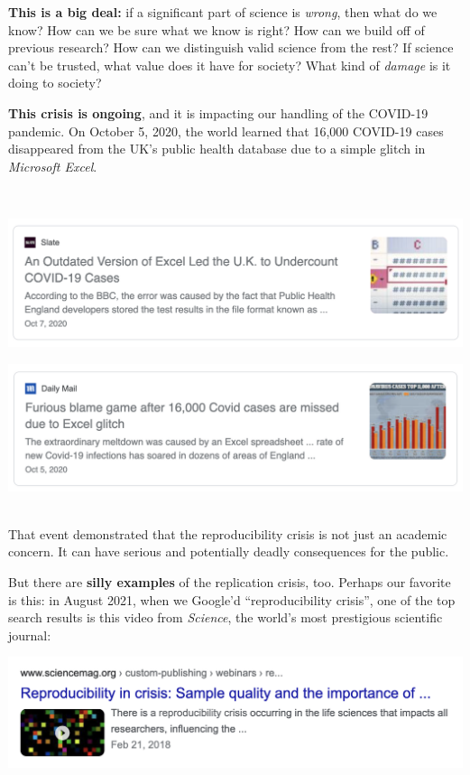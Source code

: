 \documentclass[
]{book}
\begin{document}
\textbf{This is a big deal:} if a significant part of science is \emph{wrong}, then what do we know? How can we be sure what we know is right? How can we build off of previous research? How can we distinguish valid science from the rest? If science can't be trusted, what value does it have for society? What kind of \emph{damage} is it doing to society?

\textbf{This crisis is ongoing}, and it is impacting our handling of the COVID-19 pandemic. On October 5, 2020, the world learned that 16,000 COVID-19 cases disappeared from the UK's public health database due to a simple glitch in \emph{Microsoft Excel}.

~

\includegraphics{img/reproducibility-covid-1.png}

\includegraphics{img/reproducibility-covid-2.png}
~

That event demonstrated that the reproducibility crisis is not just an academic concern. It can have serious and potentially deadly consequences for the public.

But there are \textbf{silly examples} of the replication crisis, too. Perhaps our favorite is this: in August 2021, when we Google'd ``reproducibility crisis'', one of the top search results is this video from \emph{Science}, the world's most prestigious scientific journal:

\includegraphics{img/reproducibility-1.png}
\end{document}
